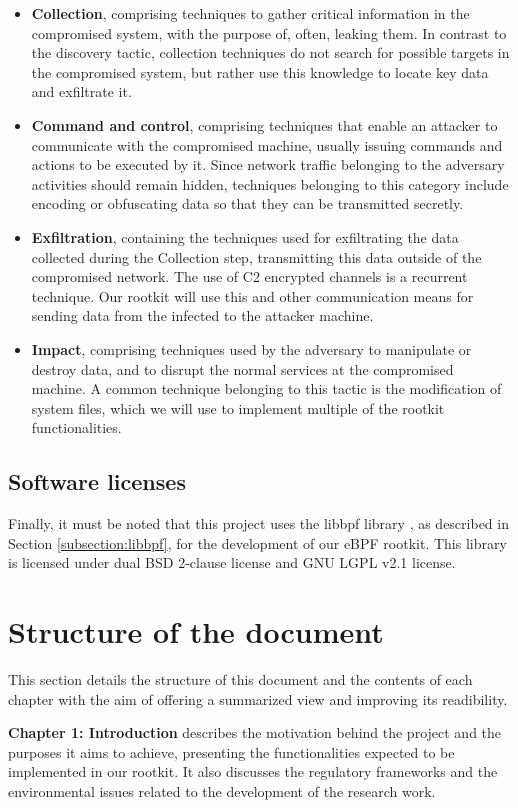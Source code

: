 \begin{itemize}
\item \textbf{Collection}, comprising techniques to gather critical information in the compromised system, with the purpose of, often, leaking them. In contrast to the discovery tactic, collection techniques do not search for possible targets in the compromised system, but rather use this knowledge to locate key data and exfiltrate it.
\item \textbf{Command and control}, comprising techniques that enable an attacker to communicate with the compromised machine, usually issuing commands and actions to be executed by it. Since network traffic belonging to the adversary activities should remain hidden, techniques belonging to this category include encoding or obfuscating data so that they can be transmitted secretly.
\item \textbf{Exfiltration}, containing the techniques used for exfiltrating the data collected during the Collection step, transmitting this data outside of the compromised network. The use of C2 encrypted channels is a recurrent technique. Our rootkit will use this and other communication means for sending data from the infected to the attacker machine.
\item \textbf{Impact}, comprising techniques used by the adversary to manipulate or destroy data, and to disrupt the normal services at the compromised machine. A common technique belonging to this tactic is the modification of system files, which we will use to implement multiple of the rootkit functionalities.
\end{itemize}

\subsection{Software licenses}
Finally, it must be noted that this project uses the libbpf library
\cite{libbpf_github}, as described in Section \ref{subsection:libbpf}, for
the development of our eBPF rootkit. This library is licensed under dual
BSD 2-clause license and GNU LGPL v2.1 license. 


\section{Structure of the document}
This section details the structure of this document and the contents of each chapter with the aim of offering a summarized view and improving its readibility.

\textbf{Chapter 1: Introduction} describes the motivation behind the project and the purposes it aims to achieve, presenting the functionalities expected to be implemented in our rootkit. It also discusses the regulatory frameworks and the environmental issues related to the development of the research work.

